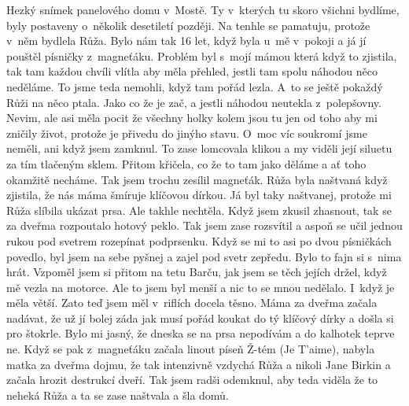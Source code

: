 
Hezký snímek panelového domu v~Mostě. Ty v~kterých tu skoro všichni
bydlíme, byly postaveny o~několik desetiletí později. Na tenhle se
pamatuju, protože v~něm bydlela Růža. Bylo nám tak 16 let, když byla
u~mě v~pokoji a já jí pouštěl písničky z~magneťáku. Problém byl s~mojí
mámou která když to zjistila, tak tam každou chvíli vlítla aby měla
přehled, jestli tam spolu náhodou něco neděláme. To jsme teda nemohli,
když tam pořád lezla. A~to se ještě pokaždý Růži na něco ptala. Jako
co že je zač, a jestli náhodou neutekla z~polepšovny. Nevim, ale asi
měla pocit že všechny holky kolem jsou tu jen od toho aby mi zničily
život, protože je přivedu do jinýho stavu. O~moc víc soukromí jsme
neměli, ani když jsem zamknul. To zase lomcovala klikou a my viděli
její siluetu za tím tlačeným sklem. Přitom křičela, co že to tam jako
děláme a ať toho okamžitě necháme. Tak jsem trochu zesílil magneťák.
Růža byla naštvaná když zjistila, že nás máma šmíruje klíčovou dírkou.
Já byl taky naštvanej, protože mi Růža slíbila ukázat prsa. Ale takhle
nechtěla. Když jsem zkusil zhasnout, tak se za dveřma rozpoutalo
hotový peklo. Tak jsem zase rozsvítil a aspoň se učil jednou rukou pod
svetrem rozepínat podprsenku. Když se mi to asi po dvou písničkách
povedlo, byl jsem na sebe pyšnej a zajel pod svetr zepředu. Bylo to
fajn si s~nima hrát. Vzpoměl jsem si přitom na tetu Barču, jak jsem se
těch jejích držel, když mě vezla na motorce. Ale to jsem byl menší a
nic to se mnou nedělalo. I~když je měla větší. Zato teď jsem měl
v~riflích docela těsno. Máma za dveřma začala nadávat, že už jí bolej
záda jak musí pořád koukat do tý klíčový dírky a došla si pro štokrle.
Bylo mi jasný, že dneska se na prsa nepodívám a do kalhotek teprve ne.
Když se pak z~magneťáku začala linout píseň Ž-tém (Je T'aime), nabyla
matka za dveřma dojmu, že tak intenzivně vzdychá Růža a nikoli Jane
Birkin a začala hrozit destrukcí dveří. Tak jsem radši odemknul, aby
teda viděla že to neheká Růža a ta se zase naštvala a šla domů.


